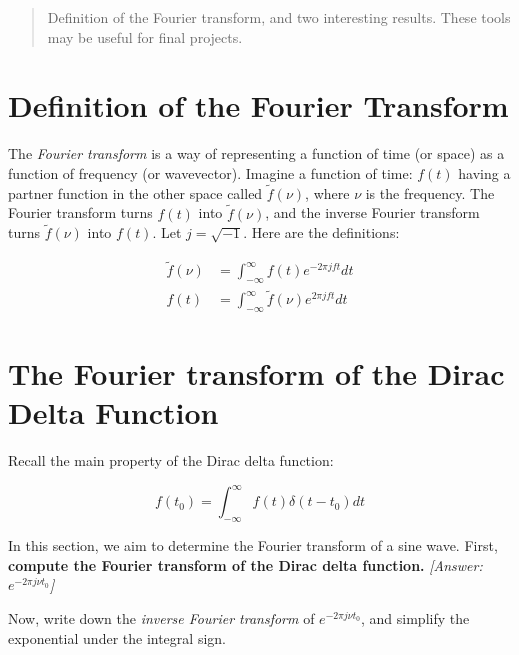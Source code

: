 \documentclass[10pt]{article}
\begin{document}
\maketitle

\begin{abstract}
Definition of the Fourier transform, and two interesting results.  These tools may be useful for final projects.
\end{abstract}
\noindent

\section{Definition of the Fourier Transform}

The \textit{Fourier transform} is a way of representing a function of time (or space) as a function of frequency (or wavevector).  Imagine a function of time: $f(t)$ having a partner function in the other space called $\widetilde{f}(\nu)$, where $\nu$ is the frequency.  The Fourier transform turns $f(t)$ into $\widetilde{f}(\nu)$, and the inverse Fourier transform turns $\widetilde{f}(\nu)$ into $f(t)$.  Let $j = \sqrt{-1}$.  Here are the definitions:

\begin{align}
\widetilde{f}(\nu) &= \int_{-\infty}^{\infty} f(t) e^{-2\pi j f t} dt \\
f(t) &= \int_{-\infty}^{\infty} \widetilde{f}(\nu) e^{2\pi j f t} dt
\end{align}

\section{The Fourier transform of the Dirac Delta Function}

Recall the main property of the Dirac delta function:

\begin{equation}
f(t_0) = \int_{-\infty}^{\infty} f(t) \delta(t - t_0) dt
\end{equation}

In this section, we aim to determine the Fourier transform of a sine wave.  First, \textbf{compute the Fourier transform of the Dirac delta function.} \textit{[Answer: $e^{-2\pi j \nu t_0}$]} \\ \vspace{1cm}

Now, write down the \textit{inverse Fourier transform} of $e^{-2\pi j \nu t_0}$, and simplify the exponential under the integral sign. \\ \vspace{1cm}
\end{document}

